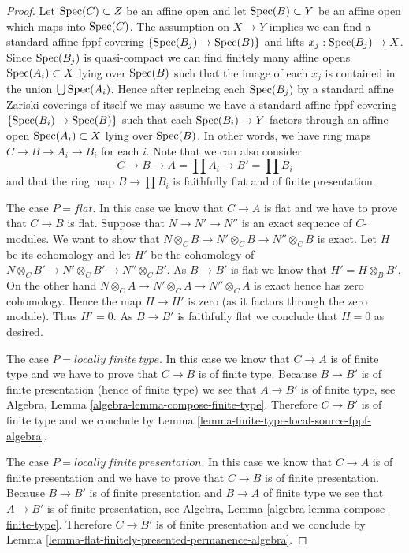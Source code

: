 \begin{proof}
Let $\mathop{\rm Spec}(C) \subset Z$ be an affine open and let
$\mathop{\rm Spec}(B) \subset Y$ be an affine open which maps into
$\mathop{\rm Spec}(C)$. The assumption on $X \to Y$ implies we can
find a standard affine fppf covering $\{\mathop{\rm Spec}(B_j) \to \mathop{\rm Spec}(B)\}$
and lifts $x_j : \mathop{\rm Spec}(B_j) \to X$. Since $\mathop{\rm Spec}(B_j)$
is quasi-compact we can find finitely many affine opens
$\mathop{\rm Spec}(A_i) \subset X$ lying over $\mathop{\rm Spec}(B)$
such that the image of each $x_j$
is contained in the union $\bigcup \mathop{\rm Spec}(A_i)$. Hence after
replacing each $\mathop{\rm Spec}(B_j)$ by a standard affine Zariski coverings
of itself we may assume we have a
standard affine fppf covering $\{\mathop{\rm Spec}(B_i) \to \mathop{\rm Spec}(B)\}$
such that each $\mathop{\rm Spec}(B_i) \to Y$ factors through an affine
open $\mathop{\rm Spec}(A_i) \subset X$ lying over $\mathop{\rm Spec}(B)$.
In other words, we have ring maps $C \to B \to A_i \to B_i$ for each $i$.
Note that we can also consider
$$
C \to B \to A = \prod A_i \to B' = \prod B_i
$$
and that the ring map $B \to \prod B_i$ is faithfully flat and
of finite presentation.

\medskip\noindent
The case $P = flat$. In this case we know that $C \to A$ is flat
and we have to prove that $C \to B$ is flat. Suppose that
$N \to N' \to N''$ is an exact sequence of $C$-modules. We want to
show that $N \otimes_C B \to N' \otimes_C B \to N'' \otimes_C B$
is exact. Let $H$ be its cohomology and let $H'$ be the cohomology
of $N \otimes_C B' \to N' \otimes_C B' \to N'' \otimes_C B'$. As
$B \to B'$ is flat we know that $H' = H \otimes_B B'$. On the other hand
$N \otimes_C A \to N' \otimes_C A \to N'' \otimes_C A$
is exact hence has zero cohomology. Hence the map
$H \to H'$ is zero (as it factors through the zero module).
Thus $H' = 0$. As $B \to B'$ is faithfully flat we conclude that
$H = 0$ as desired.

\medskip\noindent
The case $P = locally\ finite\ type$.
In this case we know that $C \to A$ is of finite type and
we have to prove that $C \to B$ is of finite type.
Because $B \to B'$ is of finite presentation (hence of finite type)
we see that $A \to B'$ is of finite type, see
Algebra, Lemma \ref{algebra-lemma-compose-finite-type}.
Therefore $C \to B'$ is of finite type and we conclude by
Lemma \ref{lemma-finite-type-local-source-fppf-algebra}.

\medskip\noindent
The case $P = locally\ finite\ presentation$.
In this case we know that $C \to A$ is of finite presentation and
we have to prove that $C \to B$ is of finite presentation.
Because $B \to B'$ is of finite presentation and $B \to A$
of finite type we see that $A \to B'$ is of finite presentation, see
Algebra, Lemma \ref{algebra-lemma-compose-finite-type}.
Therefore $C \to B'$ is of finite presentation and we conclude by
Lemma \ref{lemma-flat-finitely-presented-permanence-algebra}.
\end{proof}










